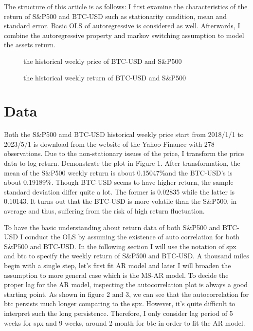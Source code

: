 \documentclass{article}
\begin{document}
  The structure of this article is as follows: I first examine the characteristics of the return 
of S\&P500 and BTC-USD such as stationarity condition, mean and standard error. 
Basic OLS of autoregressive is considered as well. Afterwards, I combine the autoregressive property and 
markov switching assumption to model the assets return.

\newpage

\begin{figure}[h!]
	\centering
	
	\caption{the historical weekly price of BTC-USD and S\&P500}
	
\end{figure}

\begin{figure}[h!]
	\centering
	
	\caption{the historical weekly return of BTC-USD and S\&P500}
	
\end{figure}


\newpage

\section{Data}
Both the S\&P500 amd BTC-USD historical weekly price start from 2018/1/1 to 2023/5/1 
is download from the website of the Yahoo Finance with 278 observations. Due to
the non-stationary issues of the price, I transform the price data to log return.
Demonstrate the plot in Figure 1. After transformation, the mean of the S\&P500 
weekly return is about 0.15047\%and the BTC-USD's is about
0.19189\%. Though BTC-USD seems to have higher return, the sample standard 
deviation differ quite a lot. The former is 0.02835 while the latter is 0.10143. 
It turns out that the BTC-USD is more volatile than the S\&P500, in average and thus, 
suffering from the risk of high return fluctuation.

To have the basic understanding about return data of both S\&P500 and BTC-USD 
I conduct the OLS by assuming the existence of auto correlation for both 
S\&P500 and BTC-USD. In the following section I will use the notation of spx and btc
to specify the weekly return of S\&P500 and BTC-USD.
A thousand miles begin with a single step,
let's first fit AR model and later I will broaden the assumption to more general case which
is the MS-AR model. To decide the proper lag for the AR model, inspecting the autocorrelation
plot is always a good starting point. As shown in figure 2 and 3, we can see that the 
autocorrelation for btc persists much longer comparing to the spx.
However, it's quite difficult to interpret such the long persistence. Therefore, 
I only consider lag period of 5 weeks for spx and 9 weeks, around 2 month for btc
in order to fit the AR model.
\end{document}
